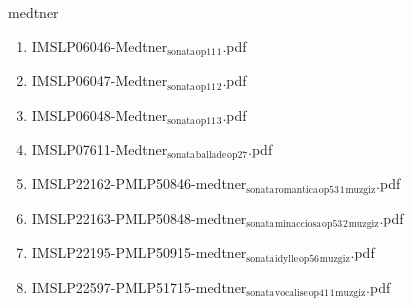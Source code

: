 \documentclass[11pt]{article}
\begin{document}
\item medtner
\label{sec-1-1-1-1-44-44}
\begin{enumerate}
\item IMSLP06046-Medtner$_{\text{sonata}}$$_{\text{op11}}$$_{\text{1}}$.pdf
\label{sec-1-1-1-1-44-44-1}

\item IMSLP06047-Medtner$_{\text{sonata}}$$_{\text{op11}}$$_{\text{2}}$.pdf
\label{sec-1-1-1-1-44-44-2}

\item IMSLP06048-Medtner$_{\text{sonata}}$$_{\text{op11}}$$_{\text{3}}$.pdf
\label{sec-1-1-1-1-44-44-3}

\item IMSLP07611-Medtner$_{\text{sonata}}$$_{\text{ballade}}$$_{\text{op27}}$.pdf
\label{sec-1-1-1-1-44-44-4}

\item IMSLP22162-PMLP50846-medtner$_{\text{sonata}}$$_{\text{romantica}}$$_{\text{op53}}$$_{\text{1}}$$_{\text{muzgiz}}$.pdf
\label{sec-1-1-1-1-44-44-5}

\item IMSLP22163-PMLP50848-medtner$_{\text{sonata}}$$_{\text{minacciosa}}$$_{\text{op53}}$$_{\text{2}}$$_{\text{muzgiz}}$.pdf
\label{sec-1-1-1-1-44-44-6}

\item IMSLP22195-PMLP50915-medtner$_{\text{sonata}}$$_{\text{idylle}}$$_{\text{op56}}$$_{\text{muzgiz}}$.pdf
\label{sec-1-1-1-1-44-44-7}

\item IMSLP22597-PMLP51715-medtner$_{\text{sonata}}$$_{\text{vocalise}}$$_{\text{op41}}$$_{\text{1}}$$_{\text{muzgiz}}$.pdf
\label{sec-1-1-1-1-44-44-8}
\end{enumerate}
\end{document}

